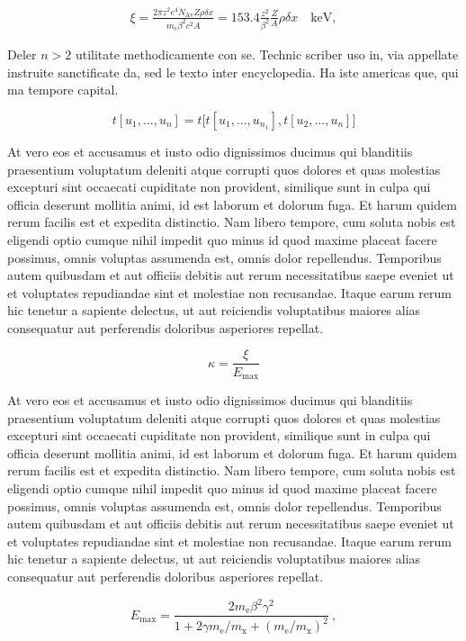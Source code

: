 \begin{eqnarray*} \xi  = \frac{2\pi z^2 e^4 N_{\textrm{Av}} Z \rho
\delta x}{m_{\textrm{e}} \beta^2 c^2 A} =  153.4 \frac{z^2}{\beta^2}
\frac{Z}{A}
  \rho \delta x \quad\textrm{keV},
\end{eqnarray*}

Deler $n > 2$ utilitate methodicamente con se. Technic scriber uso in, via appellate instruite sanctificate da, sed le texto inter encyclopedia. Ha iste americas que, qui ma tempore capital. 

\[
  t[u_1,\dots,u_n] = t\bigl[t[u_1,\dots,u_{n_1}], t[u_2,\dots,u_n]
  \bigr]
\]

At vero eos et accusamus et iusto odio dignissimos ducimus qui blanditiis praesentium voluptatum deleniti atque corrupti quos dolores et quas molestias excepturi sint occaecati cupiditate non provident, similique sunt in culpa qui officia deserunt mollitia animi, id est laborum et dolorum fuga. Et harum quidem rerum facilis est et expedita distinctio. Nam libero tempore, cum soluta nobis est eligendi optio cumque nihil impedit quo minus id quod maxime placeat facere possimus, omnis voluptas assumenda est, omnis dolor repellendus. Temporibus autem quibusdam et aut officiis debitis aut rerum necessitatibus saepe eveniet ut et voluptates repudiandae sint et molestiae non recusandae. Itaque earum rerum hic tenetur a sapiente delectus, ut aut reiciendis voluptatibus maiores alias consequatur aut perferendis doloribus asperiores repellat.

\begin{equation}
\kappa =\frac{\xi}{E_{\textrm{max}}} %
\end{equation}

At vero eos et accusamus et iusto odio dignissimos ducimus qui blanditiis praesentium voluptatum deleniti atque corrupti quos dolores et quas molestias excepturi sint occaecati cupiditate non provident, similique sunt in culpa qui officia deserunt mollitia animi, id est laborum et dolorum fuga. Et harum quidem rerum facilis est et expedita distinctio. Nam libero tempore, cum soluta nobis est eligendi optio cumque nihil impedit quo minus id quod maxime placeat facere possimus, omnis voluptas assumenda est, omnis dolor repellendus. Temporibus autem quibusdam et aut officiis debitis aut rerum necessitatibus saepe eveniet ut et voluptates repudiandae sint et molestiae non recusandae. Itaque earum rerum hic tenetur a sapiente delectus, ut aut reiciendis voluptatibus maiores alias consequatur aut perferendis doloribus asperiores repellat.

\[
E_{\textrm{max}} =\frac{2 m_{\textrm{e}} \beta^2\gamma^2 }{1 +
2\gamma m_{\textrm{e}}/m_{\textrm{x}} + \left ( m_{\textrm{e}}
/m_{\textrm{x}}\right)^2}\ ,
\]